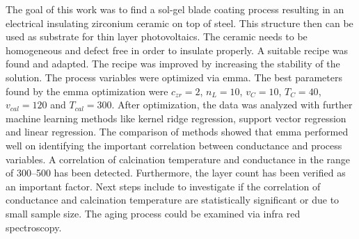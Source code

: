 The goal of this work was to find a sol-gel blade coating process resulting in an electrical insulating zirconium ceramic on top of steel.
This structure then can be used as substrate for thin layer photovoltaics. 
The ceramic needs to be homogeneous and defect free in order to insulate properly.
A suitable recipe was found\cite{Hu2016} and adapted. 
The recipe was improved by increasing the stability of the solution. 
The process variables were optimized via \gls{emma}. 
The best parameters found by the \gls{emma} optimization were 
$c_{zr}=2$, $n_L=10$, $v_{C}=10$, $T_{C}=40$, $v_{cal}=120$ and $T_{cal}=300$.
After optimization, the data was analyzed with further machine learning methods like kernel ridge regression, support vector regression and linear regression. 
The comparison of methods showed that \gls{emma} performed well on identifying the important correlation between conductance and process variables. 
A correlation of calcination temperature and conductance in the range of 300--500\oc{} has been detected.
Furthermore, the layer count has been verified as an important factor. 
Next steps include to investigate if the correlation of conductance and calcination temperature are statistically significant or due to small sample size. 
The aging process could be examined via infra red spectroscopy. 
\iffalse
was kann noch veraendert werden? 
humidity 
solution age
vdb and tdb on g and phd 
Tcal on g and phd 

Making of the solution for the sol-gel process:
For a single concentrated solution \ml{0.05} of \gls{zrpro} are added while stirring to \ml{4.95} of \gls{buoh} and stirred for \minutes{15}. 
\ml{0.013} (or one molar equvilent of Zr) of \gls{acac} is added to the stirring solution. 
After another \minutes{15} \ml{1} of acetic acid is added and stirred for \minutes{30} to stabilize the solution up to \h{24}. 

The concentration can be increased up to 5 times being stable for a minimum of \h{4}. 
The sol-gel process produces am homogeneous transparent crystalline zirconia oxide layer. 
homogeneity can be mainly controlled via blade speed and temperature and layers can be stacked.

It should have been also verglichen with grid search with comparable size
but most time was used to find a vernuenfig base recipe and process

It is still very human 
Der process is - as it the case with all ML and most fitting processes - is very abhaengig von hyper parameters, 
In the current work population size, number of generations, and most importantly boundaries (grenzen). 
\fi
